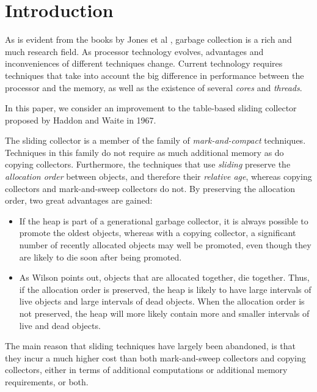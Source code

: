 \section{Introduction}

As is evident from the books by Jones et al
\cite{Jones:2011:GCH:2025255} \cite{Jones:1996:GCA:236254}, garbage
collection is a rich and much research field.  As processor technology
evolves, advantages and inconveniences of different techniques
change.  Current technology requires techniques that take into account
the big difference in performance between the processor and the
memory, as well as the existence of several \emph{cores} and
\emph{threads}. 

In this paper, we consider an improvement to the table-based sliding
collector proposed by Haddon and Waite \cite{Haddon:1967} in 1967.

The sliding collector is a member of the family of
\emph{mark-and-compact} techniques.  Techniques in this family do not
require as much additional memory as do copying collectors.
Furthermore, the techniques that use \emph{sliding} preserve the
\emph{allocation order} between objects, and therefore their
\emph{relative age}, whereas copying collectors and mark-and-sweep
collectors do not.  By preserving the allocation order, two great
advantages are gained:

\begin{itemize}
\item If the heap is part of a generational garbage collector, it is
  always possible to promote the oldest objects, whereas with a
  copying collector, a significant number of recently allocated 
  objects may well be promoted, even though they are likely to die
  soon after being promoted. 
\item As Wilson \cite{Wilson:1992:UGC:645648.664824} points out,
  objects that are allocated together, die together.  Thus, if the
  allocation order is preserved, the heap is likely to have
  large intervals of live objects and large intervals of dead
  objects.  When the allocation order is not preserved, the heap will
  more likely contain more and smaller intervals of live and dead
  objects. 
\end{itemize}

The main reason that sliding techniques have largely been abandoned,
is that they incur a much higher cost than both mark-and-sweep
collectors and copying collectors, either in terms of additional
computations or additional memory requirements, or both. 
